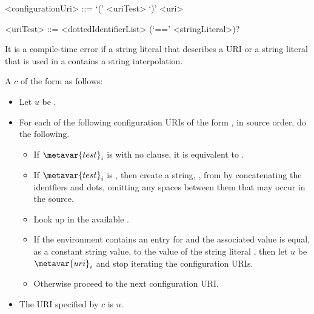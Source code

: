 \documentclass[makeidx]{article}
\begin{document}
{\begin{grammar}
<configurationUri> ::= \IF{} `(' <uriTest> `)' <uri>

<uriTest> ::= <dottedIdentifierList> (`==' <stringLiteral>)?
\end{grammar}

\LMHash{}%
It is a compile-time error if a string literal that describes a URI
or a string literal that is used in a 
contains a string interpolation.

\LMHash{}%
A  $c$ of the form
 as follows:
\begin{itemize}
\item
  Let $u$ be .
\item
  For each of the following configuration URIs of the form
  ,
  in source order, do the following.
  \begin{itemize}
  \item
    If $\metavar{test}_i$ is 
    with no \lit{==} clause, it is
    equivalent to .
  \item
    If $\metavar{test}_i$ is ,
    then create a string, , from 
    by concatenating the identfiers and dots,
    omitting any spaces between them that may occur in the source.
  \item
    Look up  in the available
    .
  \item
    If the environment contains an entry for  and the
    associated value is equal, as a constant string value, to the value of
    the string literal ,
    then let $u$ be $\metavar{uri}_i$ and stop iterating the configuration URIs.
  \item
    Otherwise proceed to the next configuration URI.
  \end{itemize}
\item
  The URI specified by $c$ is $u$.
\end{itemize}

}
\end{document}
